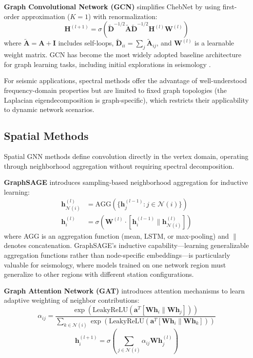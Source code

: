 \documentclass[review,authoryear]{elsarticle}
\begin{document}
\textbf{Graph Convolutional Network (GCN)} \citep{kipf2017semi} simplifies ChebNet by using first-order approximation ($K=1$) with renormalization:
\begin{equation}
\mathbf{H}^{(l+1)} = \sigma\left(\tilde{\mathbf{D}}^{-1/2}\tilde{\mathbf{A}}\tilde{\mathbf{D}}^{-1/2}\mathbf{H}^{(l)}\mathbf{W}^{(l)}\right)
\end{equation}
where $\tilde{\mathbf{A}} = \mathbf{A} + \mathbf{I}$ includes self-loops, $\tilde{\mathbf{D}}_{ii} = \sum_j \tilde{\mathbf{A}}_{ij}$, and $\mathbf{W}^{(l)}$ is a learnable weight matrix. GCN has become the most widely adopted baseline architecture for graph learning tasks, including initial explorations in seismology \citep{bilal2022graph, bloemheuvel2022graph}.

For seismic applications, spectral methods offer the advantage of well-understood frequency-domain properties but are limited to fixed graph topologies (the Laplacian eigendecomposition is graph-specific), which restricts their applicability to dynamic network scenarios.

\subsection{Spatial Methods}

Spatial GNN methods define convolution directly in the vertex domain, operating through neighborhood aggregation without requiring spectral decomposition.

\textbf{GraphSAGE} \citep{hamilton2017inductive} introduces sampling-based neighborhood aggregation for inductive learning:
\begin{align}
\mathbf{h}_{\mathcal{N}(i)}^{(l)} &= \text{AGG}\left(\{\mathbf{h}_j^{(l-1)} : j \in \mathcal{N}(i)\}\right) \\
\mathbf{h}_i^{(l)} &= \sigma\left(\mathbf{W}^{(l)} \cdot \left[\mathbf{h}_i^{(l-1)} \| \mathbf{h}_{\mathcal{N}(i)}^{(l)}\right]\right)
\end{align}
where AGG is an aggregation function (mean, LSTM, or max-pooling) and $\|$ denotes concatenation. GraphSAGE's inductive capability---learning generalizable aggregation functions rather than node-specific embeddings---is particularly valuable for seismology, where models trained on one network region must generalize to other regions with different station configurations.

\textbf{Graph Attention Network (GAT)} \citep{velickovic2018graph} introduces attention mechanisms to learn adaptive weighting of neighbor contributions:
\begin{equation}
\alpha_{ij} = \frac{\exp\left(\text{LeakyReLU}\left(\mathbf{a}^T[\mathbf{W}\mathbf{h}_i \| \mathbf{W}\mathbf{h}_j]\right)\right)}{\sum_{k \in \mathcal{N}(i)} \exp\left(\text{LeakyReLU}\left(\mathbf{a}^T[\mathbf{W}\mathbf{h}_i \| \mathbf{W}\mathbf{h}_k]\right)\right)}
\end{equation}
\begin{equation}
\mathbf{h}_i^{(l+1)} = \sigma\left(\sum_{j \in \mathcal{N}(i)} \alpha_{ij} \mathbf{W}\mathbf{h}_j^{(l)}\right)
\end{equation}
\end{document}
